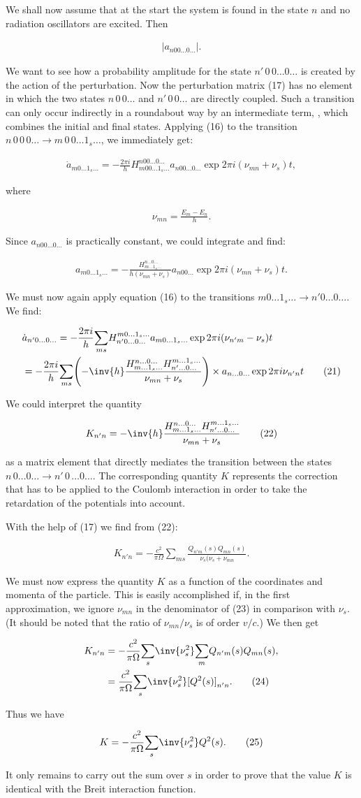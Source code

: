 \documentclass{article}
\newcommand{\nequ}[2]{
\begin{align*}
#1
\tag{#2}
\end{align*}
}
\newcommand{\uequ}[1]{
\begin{align*}
#1
\end{align*}
}
\newcommand{\sumX}[1]{\underset{#1}{\sum}}
\begin{document}
We shall now assume that at the start the system is found in the state $n$ and no radiation oscillators are excited. Then
\uequ{
|a_{n00\dots 0 \dots}|.
}
We want to see how a probability amplitude for the state $n'\,0\,0\dots 0\dots$ is created by the action of the perturbation. Now the perturbation matrix (17) has no element in which the two states $n\,0\,0\dots$ and $n'\,0\,0\dots$ are directly coupled. Such a transition can only occur indirectly in a roundabout way by an intermediate term, , which combines the initial and final states. Applying (16) to the transition $n\,0\,0\,0\dots \to m\,0\,0\dots 1_s \dots$, we immediately get:
\nequ{
\dot{a}_{m0\dots 1_s \dots} = -\frac{2\pi i}{h} H_{m00\dots 1_s \dots}^{n00\dots 0 \dots}
a_{n00\dots 0 \dots}\exp{2\pi i(\nu_{mn} + \nu_s)t},
}{19}
where
\uequ{
\nu_{mn} = \frac{E_m - E_n}{h}.
}
Since $a_{n00\dots 0\dots}$ is practically constant, we could integrate and find:
\nequ{
a_{m0\dots 1_s \dots} = -\frac{H_{m\dots 1_s \dots}^{n\dots 0 \dots}}{h(\nu_{mn} + \nu_s)}
a_{n00\dots}\exp{2\pi i(\nu_{mn} + \nu_s)t}.
}{20}
We must now again apply equation (16) to the transitions $m0\dots 1_s \dots \to n'0\dots 0\dots$. We find:
\nequ{
&\dot{a}_{n'0\dots 0 \dots} = -\frac{2\pi i}{h}
\sumX{ms}{H_{n'0\dots 0\dots}^{m0\dots 1_s \dots} a_{m0 \dots 1_s \dots}
 \exp{2\pi i(\nu_{n'm} - \nu_s)t}}\\
&= -\frac{2\pi i}{h}\sumX{ms}{\left(-\inv{h}
\frac{H_{m\dots 1_s \dots}^{n\dots 0\dots} H_{n'\dots 0\dots}^{m\dots 1_s \dots}}
{\nu_{mn} + \nu_s}\right)\times a_{n\dots 0\dots}\exp{2\pi i\nu_{n'n}t}
}
}{21}
We could interpret the quantity
\nequ{
K_{n'n} = -\inv{h}
\frac{H_{m\dots 1_s \dots}^{n\dots 0\dots} H_{n'\dots 0\dots}^{m\dots 1_s \dots}}
{\nu_{mn} + \nu_s}
}{22}
as a matrix element that directly mediates the transition between the states $n\,0\dots 0\dots \to n'\, 0\,\dots 0 \dots$. The corresponding quantity $K$ represents the correction that has to be applied to the Coulomb interaction in order to take the retardation of the potentials into account.

With the help of (17) we find from (22):
\nequ{
K_{n'n} = -\frac{c^2}{\pi\Omega}\sumX{ms}\frac{Q_{n'm}(s)Q_{mn}(s)}{\nu_s(\nu_s + \nu_{mn}}.
}{23}
We must now express the quantity $K$ as a function of the coordinates and momenta of the particle. This is easily accomplished if, in the first approximation, we ignore $\nu_{mn}$ in the denominator of (23) in comparison with $\nu_s$. (It should be noted that the ratio of $\nu_{mn}/\nu_s$ is of  order $v/c$.) We then get
\nequ{
K_{n'n} &= -\frac{c^2}{\pi\Omega}\sumX{s}{\inv{\nu_s^2}\sumX{m}{Q_{n'm}(s)Q_{mn}(s)}},\\
 &= \frac{c^2}{\pi\Omega}\sumX{s}{\inv{\nu_s^2}[Q^2(s)]_{n'n}}.
}{24}
Thus we have
\nequ{
K = -\frac{c^2}{\pi\Omega}\sumX{s}{\inv{\nu_s^2}Q^2(s)}.
}{25}
It only remains to carry out the sum over $s$ in order to prove that the value $K$ is identical with the Breit interaction function.
\end{document}
